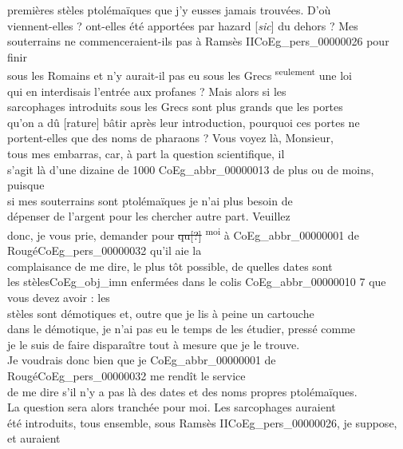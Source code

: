 \documentclass{book}
\begin{document}
\noindent premières stèles ptolémaïques que j’y eusses jamais trouvées. D’où\\
viennent-elles ? ont-elles été apportées par hazard {[\textit{sic}]} du dehors ? Mes\\
souterrains ne commenceraient-ils pas à Ramsès II\gls{CoEg_pers_00000026} pour finir\\
sous les Romains et n’y aurait-il pas eu sous les Grecs \textsuperscript{seulement} une loi\\
qui en interdisais l’entrée aux profanes ? Mais alors si les\\
sarcophages introduits sous les Grecs sont plus grands que les portes\\
qu’on a dû [rature] bâtir après leur introduction, pourquoi ces portes ne\\
portent-elles que des noms de pharaons ? Vous voyez là, Monsieur,\\
tous mes embarras, car, à part la question scientifique, il\\
s’agit là d’une dizaine de 1000 \gls{CoEg_abbr_00000013} de plus ou de moins, puisque\\
si mes souterrains sont ptolémaïques je n’ai plus besoin de\\
dépenser de l’argent pour les chercher autre part. Veuillez\\
donc, je vous prie, demander pour \sout{qu{[?]}} \textsuperscript{moi} à \gls{CoEg_abbr_00000001} de Rougé\gls{CoEg_pers_00000032} qu’il aie la\\
complaisance de me dire, le plus tôt possible, de quelles dates sont\\
les stèles\gls{CoEg_obj_imn} enfermées dans le colis \gls{CoEg_abbr_00000010} 7 que vous devez avoir : les\\
stèles sont démotiques et, outre que je lis à peine un cartouche\\
dans le démotique, je n’ai pas eu le temps de les étudier, pressé comme\\
je le suis de faire disparaître tout à mesure que je le trouve.\\
Je voudrais donc bien que je \gls{CoEg_abbr_00000001} de Rougé\gls{CoEg_pers_00000032} me rendît le service\\
de me dire s’il n’y a pas là des dates et des noms propres ptolémaïques.\\
La question sera alors tranchée pour moi. Les sarcophages auraient\\
été introduits, tous ensemble, sous Ramsès II\gls{CoEg_pers_00000026}, je suppose, et auraient\\
\end{document}
